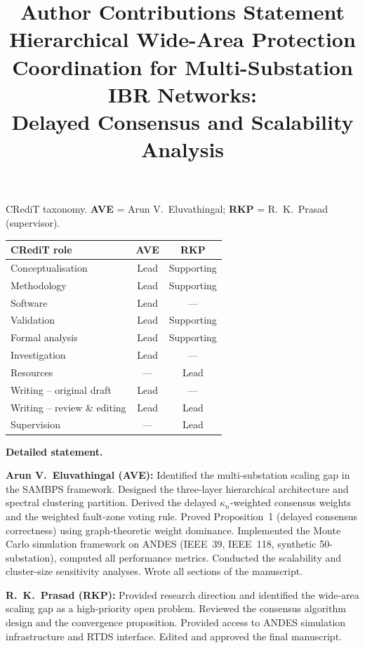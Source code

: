 \documentclass[11pt,a4paper]{article}
\title{Author Contributions Statement\\[4pt]
       \large Hierarchical Wide-Area Protection Coordination for
       Multi-Substation IBR Networks:\\
       Delayed Consensus and Scalability Analysis}
\author{}
\date{}
\begin{document}
\maketitle\thispagestyle{empty}

\noindent
CRediT taxonomy. \textbf{AVE} = Arun V.\ Eluvathingal;
\textbf{RKP} = R.\ K.\ Prasad (supervisor).

\bigskip
\begin{tabular}{@{}lcc@{}}
\toprule
\textbf{CRediT role} & \textbf{AVE} & \textbf{RKP} \\
\midrule
Conceptualisation        & Lead   & Supporting \\
Methodology              & Lead   & Supporting \\
Software                 & Lead   & ---        \\
Validation               & Lead   & Supporting \\
Formal analysis          & Lead   & Supporting \\
Investigation            & Lead   & ---        \\
Resources                & ---    & Lead       \\
Writing -- original draft & Lead   & ---        \\
Writing -- review \& editing & Lead & Lead     \\
Supervision              & ---    & Lead       \\
\bottomrule
\end{tabular}

\bigskip\noindent\textbf{Detailed statement.}

\medskip\noindent\textbf{Arun V.\ Eluvathingal (AVE):}
Identified the multi-substation scaling gap in the SAMBPS framework.
Designed the three-layer hierarchical architecture and spectral
clustering partition.  Derived the delayed $\kappa_n$-weighted
consensus weights and the weighted fault-zone voting rule.
Proved Proposition~1 (delayed consensus correctness) using graph-theoretic
weight dominance.  Implemented the Monte Carlo simulation framework on
ANDES (IEEE~39, IEEE~118, synthetic 50-substation), computed all
performance metrics.  Conducted the scalability and cluster-size
sensitivity analyses.  Wrote all sections of the manuscript.

\medskip\noindent\textbf{R.\ K.\ Prasad (RKP):}
Provided research direction and identified the wide-area scaling gap
as a high-priority open problem.  Reviewed the consensus algorithm design
and the convergence proposition.  Provided access to ANDES simulation
infrastructure and RTDS interface.  Edited and approved the
final manuscript.
\end{document}
